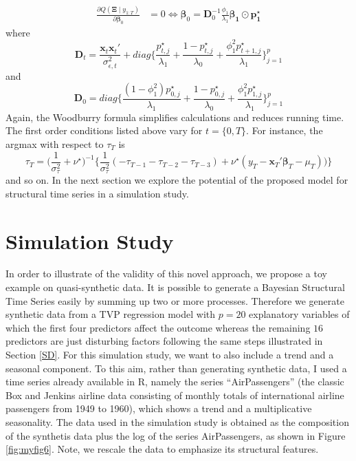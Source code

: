\documentclass[
  12pt,
]{book}
\theoremstyle{break}
\theoremstyle{nonumberplain}
\begin{document}
\begin{align*}
\frac{\partial Q(\boldsymbol{\Xi}\mid y_{1:T})}{\partial \boldsymbol{\beta}_{0}} & = 0 \iff
\boldsymbol{\beta}_{0}=\boldsymbol{D}_{0}^{-1}\frac{\phi_1}{\lambda_1}\boldsymbol{\beta_1}\odot\boldsymbol{p_{1}^{\star}}
\end{align*} where \[
\boldsymbol{D}_t=\frac{\boldsymbol{x}_{t}\boldsymbol{x}_{t}'}{\sigma^{2}_{\epsilon,t}}+diag\bigg\{\frac{p^{\star}_{t,j}}{\lambda_1}+\frac{1-p^{\star}_{t,j}}{\lambda_{0}}+\frac{\phi^{2}_{1}p^{\star}_{t+1,j}}{\lambda_{1}}\bigg\}_{j=1}^{p}
\] and \[
\boldsymbol{D}_0=diag\bigg\{\frac{(1-\phi^2_1)p^{\star}_{0,j}}{\lambda_1}+\frac{1-p^{\star}_{0,j}}{\lambda_0}+\frac{\phi^{2}_1 p^{\star}_{1,j}}{\lambda_1}\bigg\}_{j=1}^{p}
\] Again, the Woodburry formula simplifies calculations and reduces
running time. The first order conditions listed above vary for
\(t=\{0,T\}\). For instance, the argmax with respect to \(\tau_T\) is
\[\tau_{T}=\bigg(\frac{1}{\sigma^{2}_{\tau}}+\nu^{\star}\bigg)^{-1}\bigg\{\frac{1}{\sigma^{2}_{\tau}}(-\tau_{T-1}-\tau_{T-2}-\tau_{T-3})+\nu^{\star}(y_{T}-\boldsymbol{x}_{T}'\boldsymbol{\beta}_{T}-\mu_{T}))\bigg\}
\] and so on. In the next section we explore the potential of the
proposed model for structural time series in a simulation study.

\section{Simulation Study}\label{SD2}

In order to illustrate of the validity of this novel approach, we
propose a toy example on quasi-synthetic data. It is possible to
generate a Bayesian Structural Time Series easily by summing up two or
more processes. Therefore we generate synthetic data from a TVP
regression model with \(p=20\) explanatory variables of which the first
four predictors affect the outcome whereas the remaining \(16\)
predictors are just disturbing factors following the same steps
illustrated in Section \ref{SD}. For this simulation study, we want to
also include a trend and a seasonal component. To this aim, rather than
generating synthetic data, I used a time series already available in R,
namely the series ``AirPassengers'' (the classic Box and Jenkins airline
data consisting of monthly totals of international airline passengers
from 1949 to 1960), which shows a trend and a multiplicative
seasonality. The data used in the simulation study is obtained as the
composition of the synthetis data plus the log of the series
AirPassengers, as shown in Figure \ref{fig:myfig6}. Note, we rescale the
data to emphasize its structural features.
\end{document}
